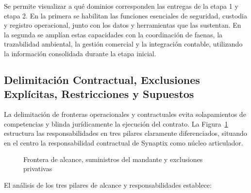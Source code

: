 Se permite visualizar a qué dominios corresponden las entregas de la etapa 1 y etapa 2. En la primera se habilitan las funciones esenciales de seguridad, custodia y registro operacional, junto con los datos y herramientas que las sustentan. En la segunda se amplían estas capacidades con la coordinación de faenas, la trazabilidad ambiental, la gestión comercial y la integración contable, utilizando la información consolidada durante la etapa inicial.

\subsection{Delimitación Contractual, Exclusiones Explícitas, Restricciones y Supuestos}

La delimitación de fronteras operacionales y contractuales evita solapamientos de competencias y blinda jurídicamente la ejecución del contrato. La Figura~\ref{fig:diagrama-frontera-alcance} estructura las responsabilidades en tres pilares claramente diferenciados, situando en el centro la responsabilidad contractual de Synaptix como núcleo articulador.

\begin{figure}[H]
    \centering
    
    \caption{Frontera de alcance, suministros del mandante y exclusiones privativas}
    \label{fig:diagrama-frontera-alcance}
\end{figure}

El análisis de los tres pilares de alcance y responsabilidades establece:

